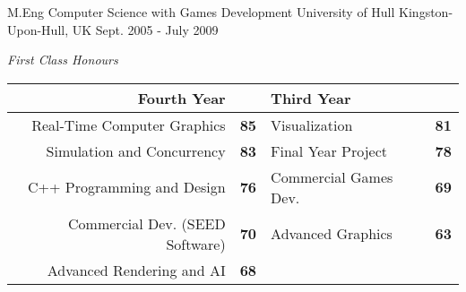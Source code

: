 
\begin{cventries}

  \cventry
    {M.Eng Computer Science with Games Development} %
    {University of Hull} %
    {Kingston-Upon-Hull, UK} %
    {Sept. 2005 - July 2009} %
    {
      \begin{cventrysummary}
          \textit{First Class Honours}
      \end{cventrysummary}
      \vspace{-2.5mm}
      \begin{center}
          \begin{tabular*}{\textwidth / 2}{@{\extracolsep{\fill}}rlll}
            Fourth Year & & Third Year & \\ \hline
            Real-Time Computer Graphics     & \textbf{85} & Visualization         & \textbf{81} \\
            Simulation and Concurrency      & \textbf{83} & Final Year Project    & \textbf{78} \\
            C++ Programming and Design      & \textbf{76} & Commercial Games Dev. & \textbf{69} \\
            Commercial Dev. (SEED Software) & \textbf{70} & Advanced Graphics     & \textbf{63} \\
            Advanced Rendering and AI       & \textbf{68} & & \\
        \end{tabular*}
      \end{center}
    }

\end{cventries}
